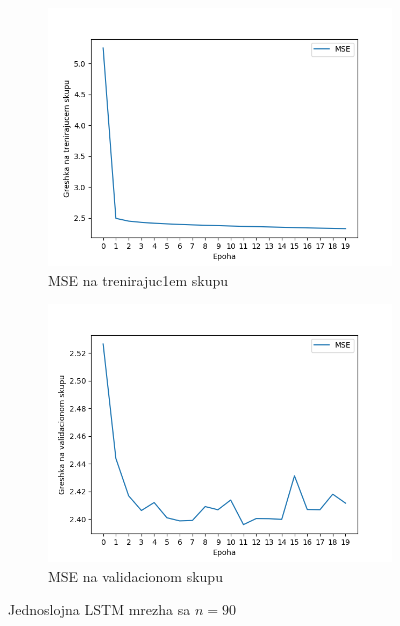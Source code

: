 \documentclass[a4paper, openany, oneside, 11pt]{book}
\begin{document}
\begin{figure}[!h]
        \centering
        \begin{subfigure}{0.475\textwidth}
            \centering
            \includegraphics[scale=0.45]{res/SingleLayerLSTM_90units_train.png}
            \caption{\acrshort{MSE} na trenirajuc1em skupu}
            \label{fig:4_3a}
            \vspace{0pt}
        \end{subfigure}%
        \begin{subfigure}{0.475\textwidth}
            \centering
            \includegraphics[scale=0.45]{res/SingleLayerLSTM_90units_validation.png}
            \caption{\acrshort{MSE} na validacionom skupu}
            \label{fig:4_3b}
            \vspace{0pt}
        \end{subfigure}
        \caption{Jednoslojna \acrshort{LSTM} mrezha sa $n=90$}
        \label{fig:4_3}
\end{figure}
\end{document}
